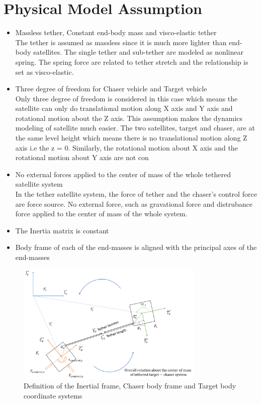 \section{Physical Model Assumption}

\begin{itemize}

\item Massless tether, Constant end-body mass and visco-elastic tether\\

The tether is assumed as massless since it is much more lighter than end-body satellites.  The single tether and sub-tether are modeled as nonlinear spring. The spring force are related to tether stretch and the relationship is set as visco-elastic.

\item Three degree of freedom for Chaser vehicle and Target vehicle\\

Only three degree of freedom is considered in this case which means the satellite can only do translational motion along X axis and Y axis and rotational motion about the Z axis. This assumption makes the dynamics modeling of satellite much easier. The two satellites, target and chaser, are at the same level height which means there is no translational motion along Z axis i.e the z = 0. Similarly, the rotational motion about X axis and the rotational motion about Y axis are not con
\item No external forces applied to the center of mass of the whole tethered satellite system\\

In the tether satellite system, the force of tether and the chaser's control force are force source. No external force, such as gravational force and distrubance force applied to the center of mass of the whole system. 
\item The Inertia matrix is constant

\item Body frame of each of the end-masses is aligned with the principal axes of the end-masses
\end{itemize}

\begin{figure}[ht]
\centering
\includegraphics[width=0.8\textwidth,right]{fig/simulation/illustration.png}
\caption{Definition of the Inertial frame, Chaser body frame and Target body coordinate systems}
\label{simu-illustration}
\end{figure}


